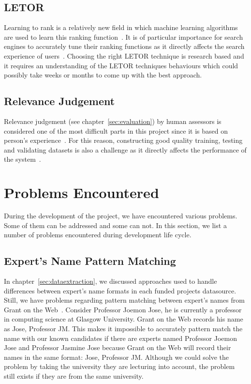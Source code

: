 \subsection{LETOR}
Learning to rank is a relatively new
field in which machine learning algorithms are used to learn this ranking function~\cite{yahooLETOR}.
It is of particular importance for search engines to accurately tune their ranking functions as
it directly affects the search experience of users~\cite{yahooLETOR}.
Choosing the right LETOR technique is research based and it requires an 
understanding of the LETOR techniques behaviours which could possibly take weeks or months to come up with the best approach.

\subsection{Relevance Judgement}\label{sec:relevanceJudgement}
Relevance judgement (see chapter~\ref{sec:evaluation}) by human assessors is considered one of the most difficult parts in this project 
since it is based on person's experience~\cite{jjtextclassification}.
For this reason, constructing good quality training, testing and validating datasets is also a challenge as it directly affects the performance of 
the system~\cite{craig}.


\section{Problems Encountered}\label{sec:problems}
During the development of the project, we have encountered various problems. Some of them can be addressed and some can not. In this section, we 
list a number of problems encountered during development life cycle.

\subsection{Expert's Name Pattern Matching}
In chapter~\ref{sec:dataextraction}, we discussed approaches used to handle differences between expert's name formats in each funded projects datasource. 
Still, we have problems regarding pattern matching between expert's names from Grant on the Web~\cite{gow}. Consider Professor Joemon Jose,
he is currently a professor in computing science at Glasgow University. Grant on the Web records his name as Jose, Professor JM.
This makes it impossible to accurately pattern match the name with our known candidates if there are experts named Professor Joemon Jose and 
Professor Jasmine Jose because Grant on the Web will record their names in the same format: Jose, Professor JM. Although we could solve the problem by taking 
the university they are lecturing into account, the problem still exists if they are from the same university.

